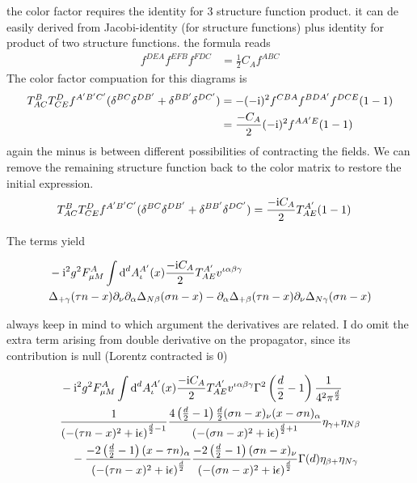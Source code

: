 the color factor requires the identity for 3 structure function product. 
it can de easily derived from Jacobi-identity (for structure functions) plus identity for product of two structure functions.
the formula reads
\begin{align}
	f^{DEA}f^{EFB}f^{FDC} &= \frac{1}{2}C_A f^{ABC}
\end{align}
The color factor compuation for this diagrams is
\begin{align}
	 T^{B}_{AC} T^{D}_{CE} f^{A'B'C'}( \delta^{BC}\delta^{DB'} + \delta^{BB'}\delta^{DC'})
	&=
	-(-\text{i})^2f^{CBA}f^{BDA'}f^{DCE} (1-1)
	\\
	&=
	\frac{- C_A}{2}(-\text{i})^2f^{AA'E} (1-1)
\end{align}
again the minus is between different possibilities of contracting the fields. 
We can remove the remaining structure function back to the color matrix to restore the initial expression.
\begin{align}
 T^{B}_{AC} T^{D}_{CE} f^{A'B'C'}( \delta^{BC}\delta^{DB'} + \delta^{BB'}\delta^{DC'})
	&=
	\frac{-\text{i} C_A}{2} T^{A'}_{AE} (1-1)
\end{align}


The terms yield

\begin{align}
	&-\text{i}^2 g^2 F_{\mu M}^{A} \int \text{d} ^d  A_\iota^{A'}(x)\frac{-\text{i} C_A}{2} T^{A'}_{AE}v^{\iota \alpha\beta\gamma}
	\\
	&\Delta_{+\gamma}(\tau n- x) \partial_{\nu} \partial_{\alpha}\Delta_{N\beta}(\sigma n -x) - \partial_{\alpha}\Delta_{+ \beta}(\tau n - x)\partial_{\nu}\Delta_{N \gamma}(\sigma n-x)
\end{align}

always keep in mind to which argument the derivatives are related. I do omit the extra term arising from double derivative on the propagator, since its contribution is null (Lorentz contracted is 0)

\begin{align}
	&-\text{i}^2 g^2 F_{\mu M}^{A} \int \text{d} ^d  A_\iota^{A'}(x)\frac{-\text{i} C_A}{2} T^{A'}_{AE}v^{\iota \alpha\beta\gamma}\Gamma^2\left(\frac{d}{2}-1\right)\frac{1}{4^2\pi^\frac{d}{2}}
	\\
	&\frac{1}{\left(-(\tau n -x)^2+\text{i} \epsilon\right)^{\frac{d}{2}-1}}\frac{4\left(\frac{d}{2}-1\right)\frac{d}{2}(\sigma n -x)_\nu(x-\sigma n)_\alpha}{\left(-(\sigma n -x)^2+\text{i} \epsilon\right)^{\frac{d}{2}+1}}\eta_{\gamma +}\eta_{N \beta}
	\\&~~~
	-\frac{-2\left(\frac{d}{2}-1\right)(x -\tau n)_\alpha}{\left(-(\tau n -x)^2+\text{i} \epsilon\right)^{\frac{d}{2}}}\frac{-2\left(\frac{d}{2}-1\right)( \sigma n -x )_\nu}{\left(-(\sigma n -x)^2+\text{i} \epsilon\right)^{\frac{d}{2}}}\Gamma(d) \eta_{\beta +}\eta_{N \gamma}
\end{align}

